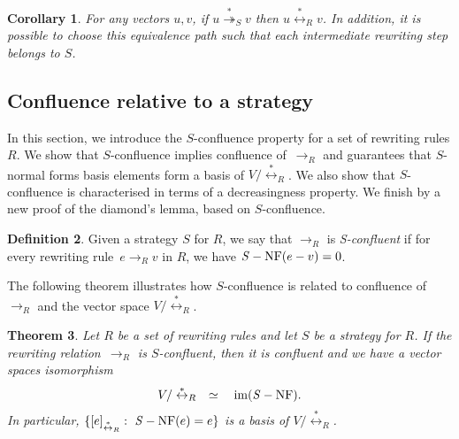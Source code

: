 \documentclass[11pt]{article}
\newtheorem{theorem}{Theorem}[section]
\newtheorem{corollary}[theorem]{Corollary}
\theoremstyle{definition}
\newtheorem{definition}[theorem]{Definition}
\DeclareMathOperator{\im}{im}
\newcommand\rewR{\to_R}
\newcommand\transParS{\overset{*}{\twoheadrightarrow}_S}
\newcommand\equivR{\overset{*}{\leftrightarrow}_R}
\DeclareMathOperator{\SNF}{{\it S}-NF}
\begin{document}
\begin{corollary}\label{cor:transS_equivR}
  For any vectors $u,v$, if $u \transParS v$ then $u\equivR v$. In
  addition, it is possible to choose this equivalence path such that each
  intermediate rewriting step belongs to $S$.
\end{corollary}

\subsection{Confluence relative to a strategy}
\label{sec:confluence_relative_to_a_strategy}

In this section, we introduce the $S$-confluence property for a set of
rewriting rules $R$. We show that $S$-confluence implies confluence
of~$\rewR$ and guarantees that $S$-normal forms basis elements form a
basis of $V/\equivR$. We also show that $S$-confluence is characterised
in terms of a decreasingness property. We finish by a new proof of the
diamond's lemma, based on $S$-confluence. 
\smallskip

\begin{definition}\label{def:standardisation_property}
  Given a strategy $S$ for $R$, we say that $\rewR$ is \emph{S-confluent}
  if for every rewriting rule~$e\rewR v$ in $R$, we have $\SNF(e-v)=0$.
\end{definition}
\smallskip

The following theorem illustrates how $S$-confluence is related to
confluence of $\rewR$ and the vector space $V/\equivR$.
\medskip

\begin{theorem}\label{thm:S-confluence_criterion}
  Let $R$ be a set of rewriting rules and let $S$ be a strategy for $R$.
  If the rewriting relation~$\rewR$ is $S$-confluent, then it is
  confluent and we have a vector spaces isomorphism
  \begin{equation}\label{equ:iso_SNF}
    V/\equivR\quad\simeq\quad\im(\SNF).
  \end{equation}
  In particular, $\{[e]_{\equivR}:\ \SNF(e)=e\}$ is a basis of
  $V/\equivR$.
\end{theorem}
\end{document}
